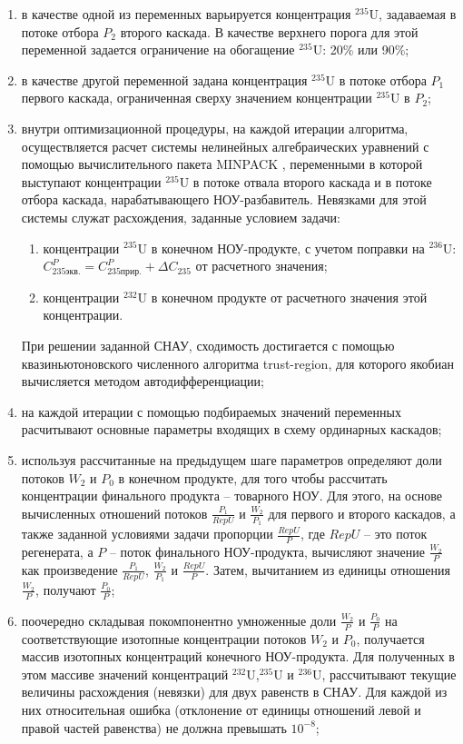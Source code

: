 \begin{enumerate}
    \item в качестве одной из переменных варьируется концентрация $^{235}$U, задаваемая в потоке отбора $P_2$ второго каскада. В качестве верхнего порога для этой переменной задается ограничение на обогащение $^{235}$U: 20\% или 90\%;
    \item в качестве другой переменной задана концентрация $^{235}$U в потоке отбора $P_1$ первого каскада, ограниченная сверху значением концентрации $^{235}$U в $P_2$;
    \item внутри оптимизационной процедуры, на каждой итерации алгоритма, осуществляется расчет системы нелинейных алгебраических уравнений с помощью вычислительного пакета MINPACK \cite{moreMINPACK}, переменными в которой выступают концентрации $^{235}$U в потоке отвала второго каскада и в потоке отбора каскада, нарабатывающего НОУ-разбавитель. Невязками для этой системы служат расхождения, заданные условием задачи:
    \begin{enumerate}
        \item концентрации $^{235}$U в  конечном НОУ-продукте, с учетом поправки на $^{236}$U: $C_{235 экв.}^{P}=C_{235 прир.}^{P}+\Delta C_{235}$ от расчетного значения;
        \item концентрации $^{232}$U в конечном продукте от расчетного значения этой концентрации.
    \end{enumerate}
    При решении заданной СНАУ, сходимость достигается с помощью квазиньютоновского численного алгоритма trust-region, для которого якобиан вычисляется методом автодифференциации;
    \item  на каждой итерации с помощью подбираемых значений переменных расчитывают основные параметры входящих в схему ординарных каскадов;
    \item  используя рассчитанные на предыдущем шаге параметров определяют доли потоков $W_2$ и $P_0$ в конечном продукте, для того чтобы рассчитать концентрации финального продукта -- товарного НОУ. Для этого, на основе вычисленных отношений потоков $\frac{P_{1}}{RepU}$ и $\frac{W_{2}}{P_{1}}$ для первого и второго каскадов, а также заданной условиями задачи пропорции $\frac{RepU}{P}$, где $RepU$ -- это поток регенерата, а $P$ -- поток финального НОУ-продукта, вычисляют значение $\frac{W_{2}}{P}$ как произведение $\frac{P_{1}}{RepU}$, $\frac{W_{2}}{P_{1}}$ и $\frac{RepU}{P}$. Затем, вычитанием из единицы отношения $\frac{W_{2}}{P}$, получают $\frac{P_{0}}{P}$;
    \item поочередно складывая покомпонентно умноженные доли $\frac{W_{2}}{P}$ и $\frac{P_{0}}{P}$ на соответствующие изотопные концентрации потоков $W_2$ и $P_0$, получается массив изотопных концентраций конечного НОУ-продукта. Для полученных в этом массиве значений концентраций $^{232}$U,$^{235}$U и $^{236}$U, рассчитывают текущие величины расхождения (невязки) для двух равенств в СНАУ. Для каждой из них относительная ошибка (отклонение от единицы отношений левой и правой частей равенства) не должна превышать $10^{-8}$;

\end{enumerate}
